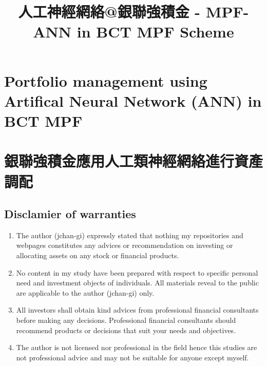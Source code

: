 \documentclass[
]{article}
\title{人工神經網絡@銀聯強積金 - MPF-ANN in BCT MPF Scheme}
\author{}
\date{\vspace{-2.5em}}
\providecommand{\tightlist}{%
  \setlength{\itemsep}{0pt}\setlength{\parskip}{0pt}}
\begin{document}
\maketitle

\hypertarget{portfolio-management-using-artifical-neural-network-ann-in-bct-mpf}{%
\section{Portfolio management using Artifical Neural Network (ANN) in
BCT
MPF}\label{portfolio-management-using-artifical-neural-network-ann-in-bct-mpf}}

\hypertarget{ux9280ux806fux5f37ux7a4dux91d1ux61c9ux7528ux4ebaux5de5ux985eux795eux7d93ux7db2ux7d61ux9032ux884cux8cc7ux7522ux8abfux914d}{%
\section{銀聯強積金應用人工類神經網絡進行資產調配}\label{ux9280ux806fux5f37ux7a4dux91d1ux61c9ux7528ux4ebaux5de5ux985eux795eux7d93ux7db2ux7d61ux9032ux884cux8cc7ux7522ux8abfux914d}}

\hypertarget{disclamier-of-warranties}{%
\subsection{Disclamier of warranties}\label{disclamier-of-warranties}}

\begin{enumerate}
\def\labelenumi{\arabic{enumi}.}
\tightlist
\item
  The author (jchan-gi) expressly stated that nothing my repositories
  and webpages constitutes any advices or recommendation on investing or
  allocating assets on any stock or financial products.\\
\item
  No content in my study have been prepared with respect to specific
  personal need and investment objects of individuals. All materials
  reveal to the public are applicable to the author (jchan-gi) only.
\item
  All investors shall obtain kind advices from professional financial
  consultants before making any decisions. Professional financial
  consultants should recommend products or decisions that suit your
  needs and objectives.\\
\item
  The author is not licensed nor professional in the field hence this
  studies are not professional advice and may not be suitable for anyone
  except myself.
\end{enumerate}
\end{document}
